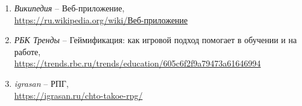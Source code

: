 \documentclass[../document.tex]{subfiles}
\begin{document}
\begin{enumerate}
    \item \textit{Википедия} -- Веб-приложение, \\\href{https://ru.wikipedia.org/wiki/Веб-приложение}{https://ru.wikipedia.org/wiki/Веб-приложение}
    \item \textit{РБК Тренды} -- Геймификация: как игровой подход помогает в обучении и на работе, \\\href{https://trends.rbc.ru/trends/education/605c6f2f9a79473a61646994}{https://trends.rbc.ru/trends/education/605c6f2f9a79473a61646994}
    \item \textit{igrasan} -- РПГ, \\\href{https://igrasan.ru/chto-takoe-rpg/}{https://igrasan.ru/chto-takoe-rpg/}
\end{enumerate}
\end{document}
